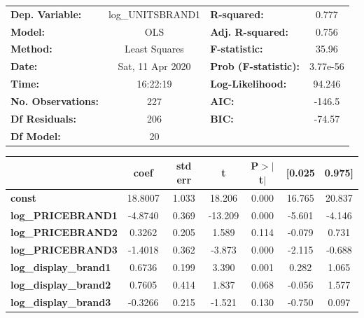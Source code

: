 \documentclass[a4paper,11pt]{article}
\begin{document}
\begin{center}
\begin{table}
\begin{tabular}{lclc}
\toprule
\textbf{Dep. Variable:}        & log\_UNITSBRAND1 & \textbf{  R-squared:         } &     0.777   \\
\textbf{Model:}                &       OLS        & \textbf{  Adj. R-squared:    } &     0.756   \\
\textbf{Method:}               &  Least Squares   & \textbf{  F-statistic:       } &     35.96   \\
\textbf{Date:}                 & Sat, 11 Apr 2020 & \textbf{  Prob (F-statistic):} &  3.77e-56   \\
\textbf{Time:}                 &     16:22:19     & \textbf{  Log-Likelihood:    } &    94.246   \\
\textbf{No. Observations:}     &         227      & \textbf{  AIC:               } &    -146.5   \\
\textbf{Df Residuals:}         &         206      & \textbf{  BIC:               } &    -74.57   \\
\textbf{Df Model:}             &          20      & \textbf{                     } &             \\
\bottomrule
\end{tabular}
\end{table}
\begin{tabular}{lcccccc}
                               & \textbf{coef} & \textbf{std err} & \textbf{t} & \textbf{P$> |$t$|$} & \textbf{[0.025} & \textbf{0.975]}  \\
\midrule
\textbf{const}                 &      18.8007  &        1.033     &    18.206  &         0.000        &       16.765    &       20.837     \\
\textbf{log\_PRICEBRAND1}      &      -4.8740  &        0.369     &   -13.209  &         0.000        &       -5.601    &       -4.146     \\
\textbf{log\_PRICEBRAND2}      &       0.3262  &        0.205     &     1.589  &         0.114        &       -0.079    &        0.731     \\
\textbf{log\_PRICEBRAND3}      &      -1.4018  &        0.362     &    -3.873  &         0.000        &       -2.115    &       -0.688     \\
\textbf{log\_display\_brand1}  &       0.6736  &        0.199     &     3.390  &         0.001        &        0.282    &        1.065     \\
\textbf{log\_display\_brand2}  &       0.7605  &        0.414     &     1.837  &         0.068        &       -0.056    &        1.577     \\
\textbf{log\_display\_brand3}  &      -0.3266  &        0.215     &    -1.521  &         0.130        &       -0.750    &        0.097     \\

\end{tabular}
\end{center}
\end{document}
